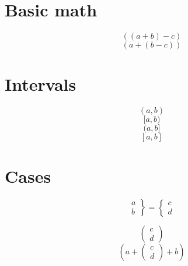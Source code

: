 \documentclass{article}
\begin{document}
%
%
%
%
%

\section{Basic math}
\[ ((a + b) - c) \]
\[ (a + (b - c)) \]

\section{Intervals}
\[ (a,b) \]
\[ [a,b) \]
\[ (a,b] \]
\[ [a,b] \]

\section{Cases}

\[ \left.\begin{array}{l} a \\ b \end{array}\right\}
  = \left\{\begin{array}{l} c\\ d\end{array}\right. \]

\[ \left(\begin{array}{l} c\\ d\end{array}\right) \]
\[ (a + \left(\begin{array}{l} c\\ d\end{array}\right) + b) \]
\end{document}

